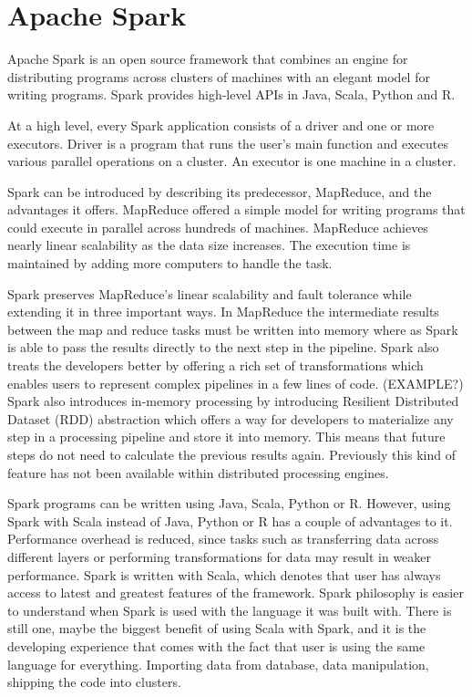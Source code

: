 \documentclass[main.tex]{thesis.tex}
\begin{document}
\chapter{Apache Spark}

Apache Spark is an open source framework that combines an engine for distributing programs across clusters of machines with an elegant model for writing programs. \cite{ryza15}
Spark provides high-level APIs in Java, Scala, Python and R.

At a high level, every Spark application consists of a driver and one or more executors.
Driver is a program that runs the user's main function and executes various parallel operations on a cluster.
An executor is one machine in a cluster.

Spark can be introduced by describing its predecessor, MapReduce, and the advantages it offers.
MapReduce offered a simple model for writing programs that could execute in parallel across hundreds of machines.
MapReduce achieves nearly linear scalability as the data size increases. The execution time is maintained by adding more computers to handle the task.

Spark preserves MapReduce's linear scalability and fault tolerance while extending it in three important ways.
In MapReduce the intermediate results between the map and reduce tasks must be written into memory where as Spark is able to pass the results directly to the next step in the pipeline.
Spark also treats the developers better by offering a rich set of transformations which enables users to represent complex pipelines in a few lines of code. (EXAMPLE?)
Spark also introduces in-memory processing by introducing Resilient Distributed Dataset (RDD) abstraction which offers a way for developers to materialize any step in a processing pipeline and store it into memory. This means that future steps do not need to calculate the previous results again.
Previously this kind of feature has not been available within distributed processing engines. \cite{ryza15}

Spark programs can be written using Java, Scala, Python or R.
However, using Spark with Scala instead of Java, Python or R has a couple of advantages to it.
Performance overhead is reduced, since tasks such as transferring data across different layers or performing transformations for data may result in weaker performance.
Spark is written with Scala, which denotes that user has always access to latest and greatest features of the framework.
Spark philosophy is easier to understand when Spark is used with the language it was built with.
There is still one, maybe the biggest benefit of using Scala with Spark, and it is the developing experience that comes with the fact that user is using the same language for everything.
Importing data from database, data manipulation, shipping the code into clusters. \cite{ryza15}
\end{document}
